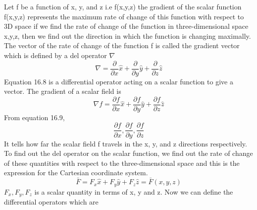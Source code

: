 Let f be a function of x, y, and z i.e f(x,y,z) the gradient of the scalar function f(x,y,z) represents the maximum rate of change of this function with respect to 3D space if we find the rate of change of the function in three-dimensional space x,y,z, then we find out the direction in which the function is changing maximally. The vector of the rate of change of the function f is called the gradient vector which is defined by a del operator $\nabla$
\begin{equation}
\nabla = \frac{\partial}{\partial x}\hat{x} + \frac{\partial}{\partial y}\hat{y} + \frac{\partial}{\partial z}\hat{z}
\end{equation} 
Equation 16.8 is a differential operator acting on a scalar function to give a vector. The gradient of a scalar field is 
\begin{equation}
\nabla f = \frac{\partial f}{\partial x}\hat{x} + \frac{\partial f}{\partial y}\hat{y} + \frac{\partial f}{\partial z}\hat{z}
\end{equation} 
From equation 16.9,
\begin{equation*}
\frac{\partial f}{\partial x}, \frac{\partial f}{\partial y}, \frac{\partial f}{\partial z}
\end{equation*}
It tells how far the scalar field f travels in the x, y, and z directions respectively. To find out the del operator on the scalar function, we find out the rate of change of these quantities with respect to the three-dimensional space and this is the expression for the Cartesian coordinate system.
\begin{equation}
\bar{F}  =  F_{x}\hat{x} + F_{y}\hat{y} + F_{z}\hat{z}  =   \bar{F}(x,y,z)
\end{equation}
$F_{x}, F_{y}, F_{z}$ is a scalar quantity in terms of x, y and z. Now we can define the differential operators which are

